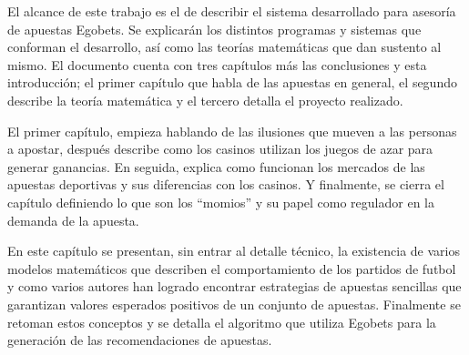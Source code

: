 El alcance de este trabajo es el de describir el sistema desarrollado para asesoría de apuestas Egobets. %
Se explicarán los distintos programas y sistemas que conforman el desarrollo, así como las teorías matemáticas que dan sustento al mismo. El documento cuenta con tres capítulos más las conclusiones y esta introducción; el primer capítulo que habla de las apuestas en general, el segundo describe la teoría matemática y el tercero detalla el proyecto realizado.

El primer capítulo, empieza hablando de las ilusiones que mueven a las personas a apostar, después describe como los casinos utilizan los juegos de azar para generar ganancias. En seguida, explica como funcionan los mercados de las apuestas deportivas y sus diferencias con los casinos. Y finalmente, se cierra el capítulo definiendo lo que son los ``momios'' y su papel como regulador en la demanda de la apuesta. 

En este capítulo se presentan, sin entrar al detalle técnico, la existencia de varios modelos matemáticos que describen el comportamiento de los partidos de futbol y como varios autores han logrado encontrar estrategias de apuestas sencillas que garantizan valores esperados positivos de un conjunto de apuestas.
Finalmente se retoman estos conceptos y se detalla el algoritmo que utiliza Egobets para la generación de las recomendaciones de apuestas.



